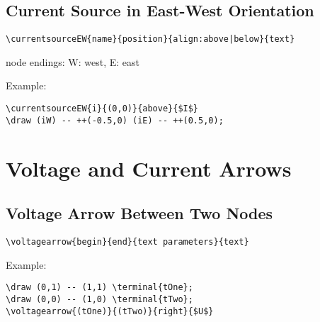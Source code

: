 \documentclass[parskip=full]{scrartcl}
\begin{document}
\subsection{Current Source in East-West Orientation}

\begin{verbatim}
\currentsourceEW{name}{position}{align:above|below}{text}
\end{verbatim}
node endings: W: west, E: east

Example:\\
\begin{minipage}{0.8\textwidth}
\begin{verbatim}
\currentsourceEW{i}{(0,0)}{above}{$I$}
\draw (iW) -- ++(-0.5,0) (iE) -- ++(0.5,0);
\end{verbatim}
\end{minipage}
\begin{minipage}{0.19\textwidth}
\end{minipage}

\section{Voltage and Current Arrows}

\subsection{Voltage Arrow Between Two Nodes}

\begin{verbatim}
\voltagearrow{begin}{end}{text parameters}{text}
\end{verbatim}

Example:\\
\begin{minipage}{0.8\textwidth}
\begin{verbatim}
\draw (0,1) -- (1,1) \terminal{tOne};
\draw (0,0) -- (1,0) \terminal{tTwo};
\voltagearrow{(tOne)}{(tTwo)}{right}{$U$}
\end{verbatim}
\end{minipage}
\begin{minipage}{0.19\textwidth}
\end{minipage}
\end{document}
